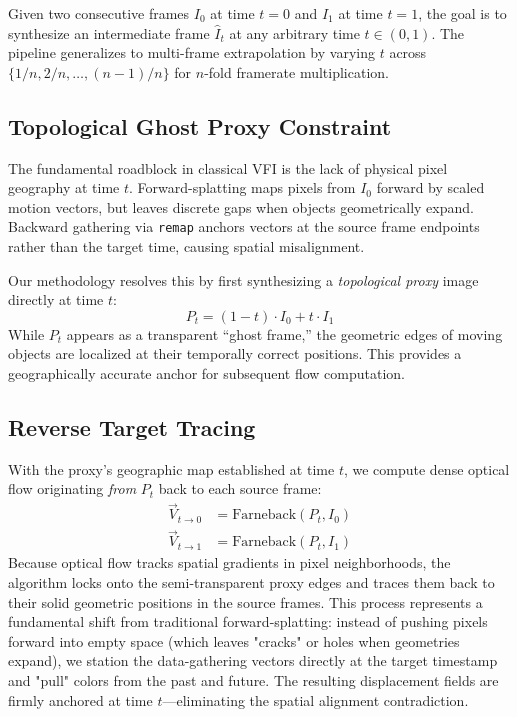 \documentclass{article}
\begin{document}
Given two consecutive frames $I_0$ at time $t=0$ and $I_1$ at time $t=1$, the goal is to synthesize an intermediate frame $\hat{I}_t$ at any arbitrary time $t \in (0, 1)$. The pipeline generalizes to multi-frame extrapolation by varying $t$ across $\{1/n, 2/n, \ldots, (n{-}1)/n\}$ for $n$-fold framerate multiplication.

\subsection{Topological Ghost Proxy Constraint}

The fundamental roadblock in classical VFI is the lack of physical pixel geography at time $t$. Forward-splatting maps pixels from $I_0$ forward by scaled motion vectors, but leaves discrete gaps when objects geometrically expand. Backward gathering via \texttt{remap} anchors vectors at the source frame endpoints rather than the target time, causing spatial misalignment.

Our methodology resolves this by first synthesizing a \textit{topological proxy} image directly at time $t$:
\begin{equation}
    P_t = (1-t) \cdot I_0 + t \cdot I_1
    \label{eq:proxy}
\end{equation}
While $P_t$ appears as a transparent ``ghost frame,'' the geometric edges of moving objects are localized at their temporally correct positions. This provides a geographically accurate anchor for subsequent flow computation.

\subsection{Reverse Target Tracing}

With the proxy's geographic map established at time $t$, we compute dense optical flow originating \textit{from} $P_t$ back to each source frame:
\begin{align}
    \vec{V}_{t \to 0} &= \text{Farneback}(P_t, I_0) \label{eq:flow0} \\
    \vec{V}_{t \to 1} &= \text{Farneback}(P_t, I_1) \label{eq:flow1}
\end{align}
Because optical flow tracks spatial gradients in pixel neighborhoods, the algorithm locks onto the semi-transparent proxy edges and traces them back to their solid geometric positions in the source frames. This process represents a fundamental shift from traditional forward-splatting: instead of pushing pixels forward into empty space (which leaves "cracks" or holes when geometries expand), we station the data-gathering vectors directly at the target timestamp and "pull" colors from the past and future. The resulting displacement fields are firmly anchored at time $t$---eliminating the spatial alignment contradiction.
\end{document}
